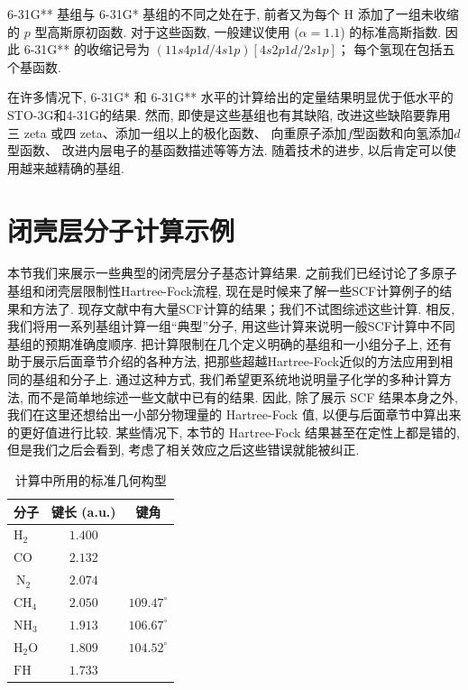 6-31G** 基组与 6-31G* 基组的不同之处在于, 
前者又为每个 H 添加了一组未收缩的 $p$ 型高斯原初函数. 
对于这些函数, 一般建议使用 ($\alpha = 1.1$) 的标准高斯指数. 
因此 6-31G** 的收缩记号为 $(11s4p1d/4s1p)[4s2p1d/2s1p]$；
每个氢现在包括五个基函数. 


在许多情况下, 
6-31G* 和 6-31G** 水平的计算给出的定量结果明显优于低水平的STO-3G和4-31G的结果.  
然而, 即使是这些基组也有其缺陷, 
改进这些缺陷要靠用三 zeta 或四 zeta、添加一组以上的极化函数、
向重原子添加$f$型函数和向氢添加$d$型函数、
改进内层电子的基函数描述等等方法. 
随着技术的进步, 以后肯定可以使用越来越精确的基组. 


\section{闭壳层分子计算示例}
本节我们来展示一些典型的闭壳层分子基态\hft 计算结果. 
之前我们已经讨论了多原子基组和闭壳层限制性Hartree-Fock流程, 
现在是时候来了解一些SCF计算例子的结果和方法了. 
现存文献中有大量SCF计算的结果；我们不试图综述这些计算. 
相反, 我们将用一系列基组计算一组“典型”分子, 
用这些计算来说明一般SCF计算中不同基组的预期准确度顺序. 
把计算限制在几个定义明确的基组和一小组分子上, 
还有助于展示后面章节介绍的各种方法,
把那些超越Hartree-Fock近似的方法应用到相同的基组和分子上. 
通过这种方式, 
我们希望更系统地说明量子化学的多种计算方法, 
而不是简单地综述一些文献中已有的结果. 
因此, 除了展示 SCF 结果本身之外, 
我们在这里还想给出一小部分物理量的 Hartree-Fock 值, 
以便与后面章节中算出来的更好值进行比较. 
某些情况下, 本节的 Hartree-Fock 结果甚至在定性上都是错的, 
但是我们之后会看到, 考虑了相关效应之后这些错误就能被纠正. 

\begin{table}\centering
	\caption{计算中所用的标准几何构型}
	\begin{tabular}{lcc}
		\hline 分子 & 键长 (a.u.) & 键角 \\
		\hline $\mathrm{H}_2$ & $1.400$ & \\
		$\mathrm{CO}$ & $2.132$ & \\
		$\mathrm{~N}_2$ & $2.074$ & \\
		$\mathrm{CH}_4$ & $2.050$ & $109.47^{\circ}$ \\
		$\mathrm{NH}_3$ & $1.913$ & $106.67^{\circ}$ \\
		$\mathrm{H}_2 \mathrm{O}$ & $1.809$ & $104.52^{\circ}$ \\
		$\mathrm{FH}$ & $1.733$ & \\
		\hline
	\end{tabular}
\label{tab:3.10}
\end{table}

